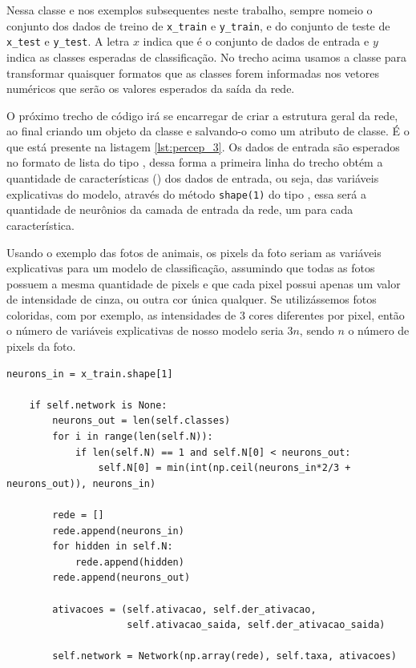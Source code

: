 Nessa classe e nos exemplos subsequentes neste trabalho, sempre nomeio o conjunto dos dados de treino de \texttt{x\_train} e \texttt{y\_train}, e do conjunto de teste de \texttt{x\_test} e \texttt{y\_test}. A letra $x$ indica que é o conjunto de dados de entrada e $y$ indica as classes esperadas de classificação. No trecho acima usamos a classe  para transformar quaisquer formatos que as classes forem informadas nos vetores numéricos que serão os valores esperados da saída da rede.

O próximo trecho de código irá se encarregar de criar a estrutura geral da rede, ao final criando um objeto da classe  e salvando-o como um atributo de classe. É o que está presente na listagem \ref{lst:percep_3}. Os dados de entrada são esperados no formato de lista do tipo , dessa forma a primeira linha do trecho obtém a quantidade de características () dos dados de entrada, ou seja, das variáveis explicativas do modelo, através do método \texttt{shape(1)} do tipo , essa será a quantidade de neurônios da camada de entrada da rede, um para cada característica.

Usando o exemplo das fotos de animais, os pixels da foto seriam as variáveis explicativas para um modelo de classificação, assumindo que todas as fotos possuem a mesma quantidade de pixels e que cada pixel possui apenas um valor de intensidade de cinza, ou outra cor única qualquer. Se utilizássemos fotos coloridas, com por exemplo, as intensidades de $3$ cores diferentes por pixel, então o número de variáveis explicativas de nosso modelo seria $3n$, sendo $n$ o número de pixels da foto.
\newline
\estiloR
\begin{lstlisting}[caption={Trecho da classe \eng{Perceptron}}, label={lst:percep_3}, escapeinside={\%}]
	neurons_in = x_train.shape[1]

	if self.network is None:
	    neurons_out = len(self.classes)
	    for i in range(len(self.N)):
	        if len(self.N) == 1 and self.N[0] < neurons_out:
	            self.N[0] = min(int(np.ceil(neurons_in*2/3 + neurons_out)), neurons_in)
	    
	    rede = []
	    rede.append(neurons_in)
	    for hidden in self.N:
	        rede.append(hidden)
	    rede.append(neurons_out)
	    
	    ativacoes = (self.ativacao, self.der_ativacao, 
	                 self.ativacao_saida, self.der_ativacao_saida)

	    self.network = Network(np.array(rede), self.taxa, ativacoes)
\end{lstlisting}


